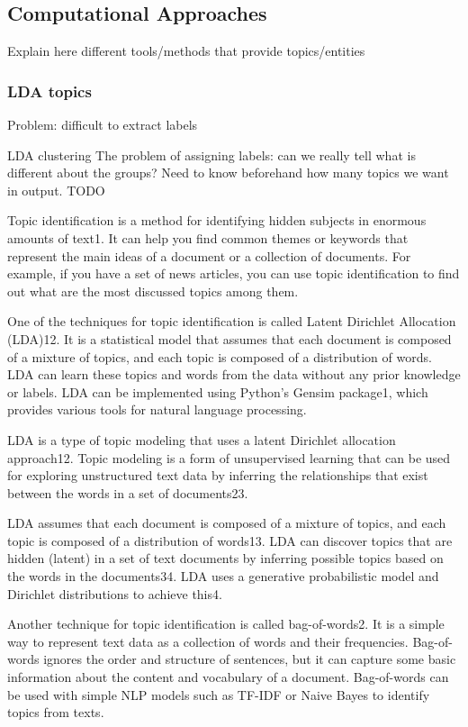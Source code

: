 \subsection{Computational Approaches}

Explain here different tools/methods that provide topics/entities



\subsubsection{LDA topics}

Problem: difficult to extract labels

LDA clustering
The problem of assigning labels: can we really tell what is different about the groups?
Need to know beforehand how many topics we want in output.
TODO

Topic identification is a method for identifying hidden subjects in enormous amounts of text1. It can help you find common themes or keywords that represent the main ideas of a document or a collection of documents. For example, if you have a set of news articles, you can use topic identification to find out what are the most discussed topics among them.

One of the techniques for topic identification is called Latent Dirichlet Allocation (LDA)12. It is a statistical model that assumes that each document is composed of a mixture of topics, and each topic is composed of a distribution of words. LDA can learn these topics and words from the data without any prior knowledge or labels. LDA can be implemented using Python’s Gensim package1, which provides various tools for natural language processing.

LDA is a type of topic modeling that uses a latent Dirichlet allocation approach12. Topic modeling is a form of unsupervised learning that can be used for exploring unstructured text data by inferring the relationships that exist between the words in a set of documents23.

LDA assumes that each document is composed of a mixture of topics, and each topic is composed of a distribution of words13. LDA can discover topics that are hidden (latent) in a set of text documents by inferring possible topics based on the words in the documents34. LDA uses a generative probabilistic model and Dirichlet distributions to achieve this4.

Another technique for topic identification is called bag-of-words2. It is a simple way to represent text data as a collection of words and their frequencies. Bag-of-words ignores the order and structure of sentences, but it can capture some basic information about the content and vocabulary of a document. Bag-of-words can be used with simple NLP models such as TF-IDF or Naive Bayes to identify topics from texts.


